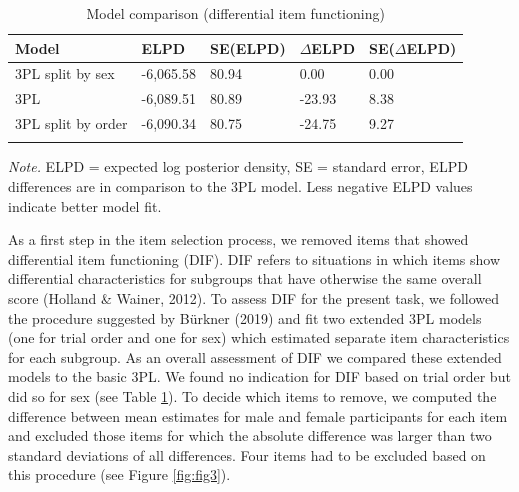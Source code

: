 \documentclass[
  man,floatsintext]{apa6}
\begin{document}
\begin{table}[tbp]

\begin{center}
\begin{threeparttable}

\caption{\label{tab:tab2}Model comparison (differential item functioning)}

\begin{tabular}{lllll}
\toprule
Model & ELPD & SE(ELPD) & $\Delta$ELPD & SE($\Delta$ELPD)\\
\midrule
3PL split by sex & -6,065.58 & 80.94 & 0.00 & 0.00\\
3PL & -6,089.51 & 80.89 & -23.93 & 8.38\\
3PL split by order & -6,090.34 & 80.75 & -24.75 & 9.27\\
\bottomrule
\addlinespace
\end{tabular}

\begin{tablenotes}[para]
\normalsize{\textit{Note.} ELPD = expected log posterior density, SE = standard error, ELPD differences are in comparison to the 3PL model. Less negative ELPD values indicate better model fit.}
\end{tablenotes}

\end{threeparttable}
\end{center}

\end{table}

As a first step in the item selection process, we removed items that showed differential item functioning (DIF). DIF refers to situations in which items show differential characteristics for subgroups that have otherwise the same overall score (Holland \& Wainer, 2012). To assess DIF for the present task, we followed the procedure suggested by Bürkner (2019) and fit two extended 3PL models (one for trial order and one for sex) which estimated separate item characteristics for each subgroup. As an overall assessment of DIF we compared these extended models to the basic 3PL. We found no indication for DIF based on trial order but did so for sex (see Table \ref{tab:tab2}). To decide which items to remove, we computed the difference between mean estimates for male and female participants for each item and excluded those items for which the absolute difference was larger than two standard deviations of all differences. Four items had to be excluded based on this procedure (see Figure \ref{fig:fig3}).
\end{document}
